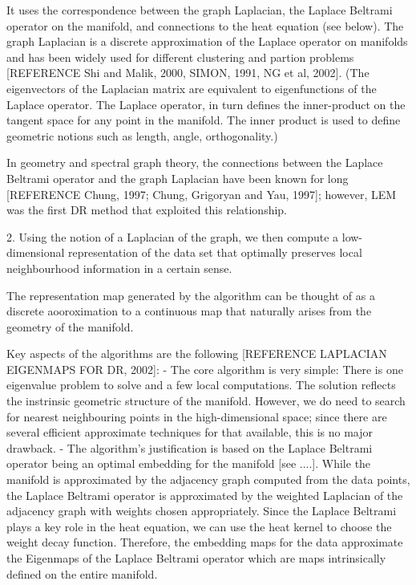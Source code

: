 \documentclass[journal, a4paper]{IEEEtran}
\begin{document}
It uses the correspondence between the graph Laplacian, the Laplace Beltrami operator on the manifold, and connections to the heat equation (see below). The graph Laplacian is a discrete approximation of the Laplace operator on manifolds and has been widely used for different clustering and partion problems [REFERENCE Shi and Malik, 2000, SIMON, 1991, NG et al, 2002]. (The eigenvectors of the Laplacian matrix are equivalent to eigenfunctions of the Laplace operator. The Laplace operator, in turn defines the inner-product on the tangent space for any point in the manifold. The inner product is used to define geometric notions such as length, angle, orthogonality.)

In geometry and spectral graph theory, the connections between the Laplace Beltrami operator and the graph Laplacian have been known for long [REFERENCE Chung, 1997; Chung, Grigoryan and Yau, 1997]; however, LEM was the first DR method that exploited this relationship. 

2. Using the notion of a Laplacian of the graph, we then compute a low-dimensional representation of the data set that optimally preserves local neighbourhood information in a certain sense.

The representation map generated by the algorithm can be thought of as a discrete aooroximation to a continuous map that naturally arises from the geometry of the manifold.

Key aspects of the algorithms are the following [REFERENCE LAPLACIAN EIGENMAPS FOR DR, 2002]:
- The core algorithm is very simple: There is one eigenvalue problem to solve and a few local computations. The solution reflects the instrinsic geometric structure of the manifold. However, we do need to search for nearest neighbouring points in the high-dimensional space; since there are several efficient approximate techniques for that available, this is no major drawback.
- The algorithm's justification is based on the Laplace Beltrami operator being an optimal embedding for the manifold [see ....]. 
While the manifold is approximated by the adjacency graph computed from the data points, the Laplace Beltrami operator is approximated by the weighted Laplacian of the adjacency graph with weights chosen appropriately. %
Since the Laplace Beltrami plays a key role in the heat equation, we can use the heat kernel to choose the weight decay function. Therefore, the embedding maps for the data approximate the Eigenmaps of the Laplace Beltrami operator which are maps intrinsically defined on the entire manifold.
\end{document}
